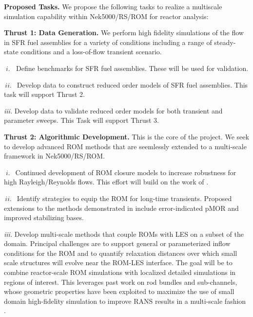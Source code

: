 \noindent

\vspace{-.1in}
{\bf Proposed Tasks.}
We propose the following tasks to realize a multiscale simulation
capability within Nek5000/RS/ROM for reactor analysis:

\textbf{Thrust 1: Data Generation.} We perform high fidelity simulations of the
flow in SFR fuel assemblies for a variety of conditions including a range of
steady-state conditions and a loss-of-flow transient scenario.
\\[-4ex]
\begin{description}
\item{$\; i.\; \;$}
Define benchmarks for SFR fuel assemblies. These will be used for validation.
\\[-4ex]
\item{$\, ii. \,\;$}
Develop data to construct reduced order models of SFR fuel assemblies. This
task will support Thrust 2.
\\[-4ex]
\item{\em iii.} Develop data to validate reduced order models for both
transient and parameter sweeps. This Task will support Thrust 3.
\\[-4ex]
\end{description}

\textbf{Thrust 2: Algorithmic Development.} This is the core of the project.
We seek to develop advanced ROM methods that are seemlessly
extended to a multi-scale framework in Nek5000/RS/ROM.
\\[-5ex]
\begin{description}
\item{$\; i.\, \;$}
Continued development of ROM closure models to increase robustness
for high Rayleigh/Reynolds flows.  This effort will build on the work of
\cite{kaneko22a,kaneko22,tsai22a,kaneko20a}.
\\[-3ex]
\item{$\, ii. \,\;$}
Identify strategies to equip the ROM for long-time transients.
Proposed extensions to the methods demonstrated in \cite{kaneko20a}
include error-indicated pMOR and improved stabilizing bases.
\\[-3ex]
\item{\em iii.}
Develop multi-scale methods that couple ROMs with LES on a subset of the
domain.  Principal challenges are to support general or parameterized inflow
conditions for the ROM and to quantify relaxation distances over which small
scale structures will evolve near the ROM-LES interface. The goal will be to
combine reactor-scale ROM simulations with localized detailed simulations in
regions of interest. This leverages past work on rod bundles and sub-channels,
whose geometric properties have been exploited to maximize the use of small
domain high-fidelity simulation to improve RANS results in a multi-scale
fashion \cite{martinez2019a}.

\\[-5ex]
\end{description}%


